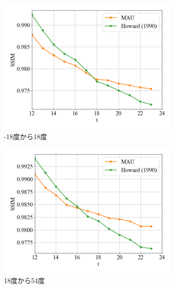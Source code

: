 \begin{figure}[htbp]
\begin{subfigure}{0.5\textwidth}
              \centering
              \includegraphics[width=\textwidth]{figures/exp1/lng_ssim_3.png}
              \caption{-18度から18度}
            \end{subfigure}
            \begin{subfigure}{0.5\textwidth}
              \centering
              \includegraphics[width=\textwidth]{figures/exp1/lng_ssim_4.png}
              \caption{18度から54度}
            \end{subfigure} \par
            \begin{subfigure}{0.5\textwidth}
              \centering

\end{subfigure}
\end{figure}
